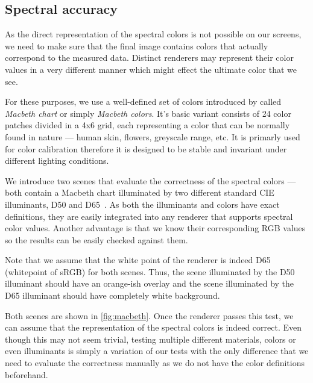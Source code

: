 \subsection{Spectral accuracy}

As the direct representation of the spectral colors is not possible on our screens, we need to make sure that the final image contains colors that actually correspond to the measured data. Distinct renderers may represent their color values in a very different manner which might effect the ultimate color that we see.

For these purposes, we use a well-defined set of colors introduced by \citet{mccamy1976color} called \emph{Macbeth chart} or simply \emph{Macbeth colors}. It's basic variant consists of 24 color patches divided in a 4x6 grid, each representing a color that can be normally found in nature --- human skin, flowers, greyscale range, etc. It is primarly used for color calibration therefore it is designed to be stable and invariant under different lighting conditions.

We introduce two scenes that evaluate the correctness of the spectral colors --- both contain a Macbeth chart illuminated by two different standard CIE illuminants, D50 and D65~\cite{cieIlluminants}. As both the illuminants and colors have exact definitions, they are easily integrated into any renderer that supports spectral color values. Another advantage is that we know their corresponding RGB values so the results can be easily checked against them.

Note that we assume that the white point of the renderer is indeed D65 (whitepoint of sRGB) for both scenes. Thus, the scene illuminated by the D50 illuminant should have an orange-ish overlay and the scene illuminated by the D65 illuminant should have completely white background.

Both scenes are shown in \autoref{fig:macbeth}. Once the renderer passes this test, we can assume that the representation of the spectral colors is indeed correct. Even though this may not seem trivial, testing multiple different materials, colors or even illuminants is simply a variation of our tests with the only difference that we need to evaluate the correctness manually as we do not have the color definitions beforehand.


